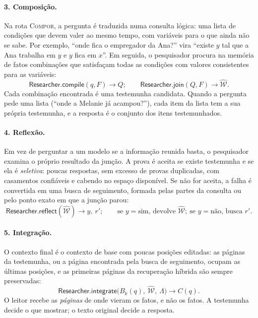 \documentclass[11pt]{article}
\newcommand{\op}[1]{\textsf{#1}}
\begin{document}
\paragraph{3. Composição.} Na rota \textsc{Compor}, a pergunta é traduzida
numa consulta lógica: uma lista de condições que devem valer ao mesmo tempo,
com variáveis para o que ainda não se sabe. Por exemplo, ``onde fica o
empregador da Ana?'' vira ``existe $y$ tal que a Ana trabalha em $y$ e $y$
fica em $x$''. Em seguida, o pesquisador procura na memória de fatos
combinações que satisfaçam todas as condições com valores consistentes para
as variáveis:
\begin{equation}
\op{Researcher.compile}(q, F)\rightarrow Q;\qquad
\op{Researcher.join}(Q, F)\rightarrow\widehat{\mathcal{W}}.
\label{eq:compose}
\end{equation}
Cada combinação encontrada é uma testemunha candidata. Quando a pergunta pede
uma lista (``onde a Melanie já acampou?''), cada item da lista tem a sua
própria testemunha, e a resposta é o conjunto dos itens testemunhados.

\paragraph{4. Reflexão.} Em vez de perguntar a um modelo se a informação
reunida basta, o pesquisador examina o próprio resultado da junção. A prova é
aceita se existe testemunha e se ela é \emph{seletiva}: poucas respostas,
sem excesso de provas duplicadas, com casamentos confiáveis e cabendo no
espaço disponível. Se não for aceita, a falha é convertida em uma busca de
seguimento, formada pelas partes da consulta ou pelo ponto exato em que a
junção parou:
\begin{equation}
\op{Researcher.reflect}(\widehat{\mathcal{W}})\rightarrow y,\ r';\qquad
\text{se } y=\text{sim, devolve } \widehat{\mathcal{W}};\ \text{se } y=\text{não, busca } r'.
\label{eq:reflect}
\end{equation}

\paragraph{5. Integração.} O contexto final é o contexto de base com poucas
posições editadas: as páginas da testemunha, ou a página encontrada pela busca
de seguimento, ocupam as últimas posições, e as primeiras páginas da
recuperação híbrida são sempre preservadas:
\begin{equation}
\op{Researcher.integrate}\bigl(B_k(q),\ \widehat{\mathcal{W}},\ \Lambda\bigr)\rightarrow C(q).
\label{eq:integrate}
\end{equation}
O leitor recebe as \emph{páginas} de onde vieram os fatos, e não os fatos.
A testemunha decide o que mostrar; o texto original decide a resposta.
\end{document}
